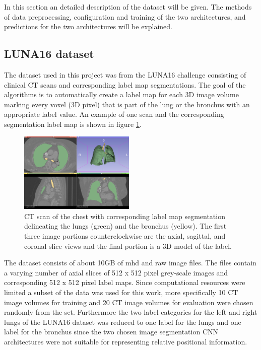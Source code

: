 
In this section an detailed description of the dataset will be given. The methods of data preprocessing, configuration and training of the two architectures, and predictions for the two architectures will be explained.

\subsection{LUNA16 dataset}

The dataset used in this project was from the LUNA16 challenge consisting of clinical CT scans and corresponding label map segmentations. The goal of the algorithms is to automatically create a label map for each 3D image volume marking every voxel (3D pixel) that is part of the lung or the bronchus with an appropriate label value. An example of one scan and the corresponding segmentation label map is shown in figure \ref{scan_picture}.

\begin{figure}[h!]
	\includegraphics[width=0.49\textwidth, angle=0]{files/Fulllayoutprediction.png}
	\caption{CT scan of the chest with corresponding label map segmentation delineating the lungs (green) and the bronchus (yellow). The first three image portions counterclockwise are the axial, sagittal, and coronal slice views and the final portion is a 3D model of the label.}
	\label{scan_picture}
\end{figure}

The dataset consists of about 10GB of mhd and raw image files. The files contain a varying number of axial slices of 512 x 512 pixel grey-scale images and corresponding 512 x 512 pixel label maps. Since computational resources were limited a subset of the data was used for this work, more specifically 10 CT image volumes for training and 20 CT image volumes for evaluation were chosen randomly from the set. Furthermore the two label categories for the left and right lungs of the LUNA16 dataset was reduced to one label for the lungs and one label for the bronchus since the two chosen image segmentation CNN architectures were not suitable for representing relative positional information.\newline

